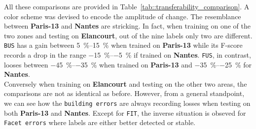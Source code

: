             All these comparisons are provided in Table~\ref{tab::transferability_comparison}.
            A color scheme was devised to encode the amplitude of change.
            The resemblance between \textbf{Paris-13} and \textbf{Nantes} are stricking.
            In fact, when training on one of the two zones and testing on \textbf{Elancourt}, out of the nine labels only two are different.
            \texttt{BUS} has a gain between \SIrange[range-phrase={ and }]{5}{15}{\percent} when trained on \textbf{Paris-13} while its F-score records a drop in the range \SIrange{-15}{-5}{\percent} if trained on \textbf{Nantes}.
            \texttt{FUS}, in contrast, looses between \SIrange[range-phrase={ and }]{-45}{-35}{\percent} when trained on \textbf{Paris-13} and \SIrange[range-phrase={ and }]{-35}{-25}{\percent} for \textbf{Nantes}.\\
            Conversely when training on \textbf{Elancourt} and testing on the other two areas, the comparisons are not as identical as before.
            However, from a general standpoint, we can see how the \texttt{building errors} are always recording losses when testing on both \textbf{Paris-13} and \textbf{Nantes}.
            Except for \texttt{FIT}, the inverse situation is obseved for \texttt{Facet errors} where labels are either better detected or stable.

